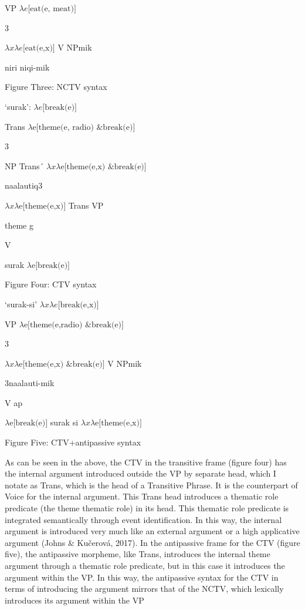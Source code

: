 \documentclass[output=paper,modfonts,nonflat]{langsci/langscibook}
\begin{document}
VP     $\mathit{\lambda e}\text{[eat(e, meat)]}$

           3  

 $\mathit{\lambda x\lambda e}\text{[eat(e,x)]}$               V            NPmik

    niri          niqi-mik

\begin{stylecaption}
Figure Three: NCTV syntax
\end{stylecaption}

  ‘surak’:   $\mathit{\lambda e}\text{[break(e)]}$

Trans     $\lambda \text{e[}\text{theme(e, radio) \& break(e)]}$

      3  

         NP        Trans´   $\mathit{\lambda x\lambda} \text{e[}\text{theme(e,x) \& break(e)]}$

    naalautiq3

 $\mathit{\lambda x\lambda} \text{e[theme(e,x)]}$        Trans      VP

         theme  g

                 V

                surak     $\lambda \text{e[break(e)]}$

\begin{stylecaption}
Figure Four: CTV syntax
\end{stylecaption}

        ‘surak-si’   $\mathit{\lambda x\lambda e}\text{[break(e,x)]}$

VP     $\lambda \text{e[theme(e,radio) \& break(e)]}$

        3

 $\mathit{\lambda x\lambda} \text{e[theme(e,x) \& break(e)]}$  V    NPmik

3naalauti-mik

V       ap

 $\lambda \text{e[break(e)]}$           surak         si     $\mathit{\lambda x\lambda} \text{e[theme(e,x)]}$

\begin{stylecaption}
Figure Five: CTV+antipassive syntax
\end{stylecaption}

As can be seen in the above, the CTV in the transitive frame (figure four) has the internal argument introduced outside the VP by separate head, which I notate as Trans, which is the head of a Transitive Phrase.  It is the counterpart of Voice for the internal argument.  This Trans head introduces a thematic role predicate (the theme thematic role) in its head.  This thematic role predicate is integrated semantically through event identification.  In this way, the internal argument is introduced very much like an external argument or a high applicative argument (Johns \& Kučerová, 2017).  In the antipassive frame for the CTV (figure five), the antipassive morpheme, like Trans, introduces the internal theme argument through a thematic role predicate, but in this case it introduces the argument within the VP.  In this way, the antipassive syntax for the CTV in terms of introducing the argument mirrors that of the NCTV, which lexically introduces its argument within the VP
\end{document}
